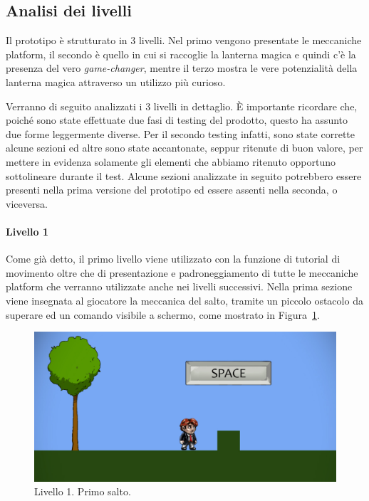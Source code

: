 \subsection{Analisi dei livelli}
\label{sec:analisi_livelli}

Il prototipo è strutturato in 3 livelli. Nel primo vengono presentate le meccaniche platform, il secondo è quello in cui si raccoglie la lanterna magica e quindi c’è la presenza del vero \textit{game-changer}, mentre il terzo mostra le vere potenzialità della lanterna magica attraverso un utilizzo più curioso.

Verranno di seguito analizzati i 3 livelli in dettaglio. È importante ricordare che, poiché sono state effettuate due fasi di testing del prodotto, questo ha assunto due forme leggermente diverse. Per il secondo testing infatti, sono state corrette alcune sezioni ed altre sono state accantonate, seppur ritenute di buon valore, per mettere in evidenza solamente gli elementi che abbiamo ritenuto opportuno sottolineare durante il test. Alcune sezioni analizzate in seguito potrebbero essere presenti nella prima versione del prototipo ed essere assenti nella seconda, o viceversa.

\paragraph{Livello 1}
\label{par:livello1}

Come già detto, il primo livello viene utilizzato con la funzione di tutorial di movimento oltre che di presentazione e padroneggiamento di tutte le meccaniche platform che verranno utilizzate anche nei livelli successivi.
Nella prima sezione viene insegnata al giocatore la meccanica del salto, tramite un piccolo ostacolo da superare ed un comando visibile a schermo, come mostrato in Figura~\ref{fig:livello1_salto}.

\begin{figure}%
	\centering
	\includegraphics[width= 0.8\columnwidth]{images/gameDesign/41_salto.jpg}
	\caption{Livello 1. Primo salto.}
	\label{fig:livello1_salto}
\end{figure}

